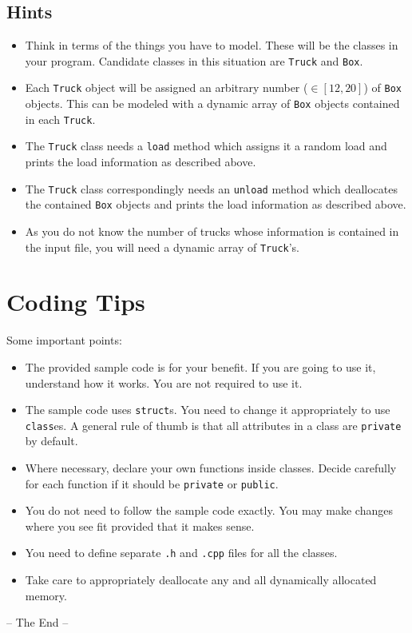 \documentclass[a4paper,12pt]{article}
\begin{document}
\subsection{Hints}
\begin{itemize}
\item Think in terms of the things you have to model. These will be the classes in your program. Candidate classes in this situation are {\tt Truck} and {\tt Box}.
\item Each {\tt Truck} object will be assigned an arbitrary number ($\in [12,20]$) of {\tt Box} objects. This can be modeled with a dynamic array of {\tt Box} objects contained in each {\tt Truck}.
\item The {\tt Truck} class needs a {\tt load} method which assigns it a random load and prints the load information as described above.
\item The {\tt Truck} class correspondingly needs an {\tt unload} method which deallocates the contained {\tt Box} objects and prints the load information as described above.
\item As you do not know the number of trucks whose information is contained in the input file, you will need a dynamic array of {\tt Truck}'s.
\end{itemize}

\section{Coding Tips}

Some important points:

\begin{itemize}
\item The provided sample code is for your benefit. If you are going to use it, understand how it works. You are not required to use it.
\item The sample code uses {\tt struct}s. You need to change it appropriately to use {\tt class}es. A general rule of thumb is that all attributes in a class are {\tt private} by default.
\item Where necessary, declare your own functions inside classes. Decide carefully for each function if it should be {\tt private} or {\tt public}.
\item You do not need to follow the sample code exactly. You may make changes where you see fit provided that it makes sense.
\item You need to define separate {\tt *.h} and {\tt *.cpp} files for all the classes.
\item Take care to appropriately deallocate any and all dynamically allocated memory.
\end{itemize}

\begin{center}
  -- The End --
\end{center}
\end{document}
